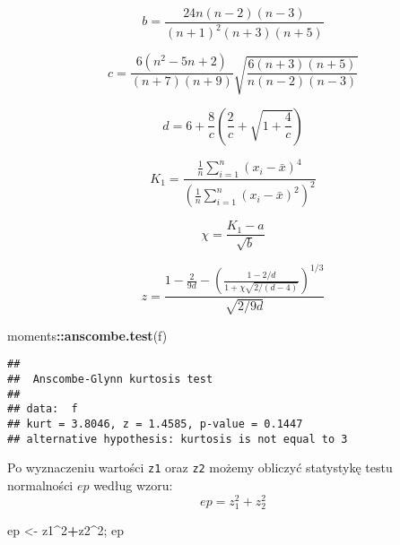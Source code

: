 \documentclass[polish,]{book}
\newenvironment{Shaded}{\begin{snugshade}}{\end{snugshade}}
\newcommand{\DecValTok}[1]{\textcolor[rgb]{0.00,0.00,0.81}{#1}}
\newcommand{\KeywordTok}[1]{\textcolor[rgb]{0.13,0.29,0.53}{\textbf{#1}}}
\newcommand{\NormalTok}[1]{#1}
\newcommand{\OperatorTok}[1]{\textcolor[rgb]{0.81,0.36,0.00}{\textbf{#1}}}
\newcommand{\StringTok}[1]{\textcolor[rgb]{0.31,0.60,0.02}{#1}}
\begin{document}
\begin{equation}
b=\frac{24n(n-2)(n-3)}{(n+1)^2(n+3)(n+5)}
\label{eq:wz1117}
\end{equation}

\begin{equation}
c=\frac{6(n^2-5n+2)}{(n+7)(n+9)}\sqrt{\frac{6(n+3)(n+5)}{n(n-2)(n-3)}}
\label{eq:wz1118}
\end{equation}

\begin{equation}
d=6+\frac{8}{c}\left(\frac{2}{c}+\sqrt{1+\frac{4}{c}}\right)
\label{eq:wz1119}
\end{equation}

\begin{equation}
K_1=\frac{\frac{1}{n}\sum_{i=1}^{n}(x_i-\bar{x})^4}{\left(\frac{1}{n}\sum_{i=1}^{n}(x_i-\bar{x})^2\right)^2}
\label{eq:wz1120}
\end{equation}

\begin{equation}
\chi=\frac{K_1-a}{\sqrt{b}}
\label{eq:wz1121}
\end{equation}

\begin{equation}
z=\frac{1-\frac{2}{9d}-\left(\frac{1-2/d}{1+\chi\sqrt{2/(d-4)}}\right)^{1/3}}{\sqrt{2/9d}}
\label{eq:wz1122}
\end{equation}

\begin{Shaded}
\begin{Highlighting}[]
\NormalTok{moments}\OperatorTok{::}\KeywordTok{anscombe.test}\NormalTok{(f)}
\end{Highlighting}
\end{Shaded}

\begin{verbatim}
## 
##  Anscombe-Glynn kurtosis test
## 
## data:  f
## kurt = 3.8046, z = 1.4585, p-value = 0.1447
## alternative hypothesis: kurtosis is not equal to 3
\end{verbatim}

Po wyznaczeniu wartości \texttt{z1} oraz \texttt{z2} możemy obliczyć statystykę testu normalności \(ep\) według wzoru:
\begin{equation}
ep=z_1^2+z_2^2
\label{eq:wz1123}
\end{equation}

\begin{Shaded}
\begin{Highlighting}[]
\NormalTok{ep <-}\StringTok{ }\NormalTok{z1}\OperatorTok{^}\DecValTok{2}\OperatorTok{+}\NormalTok{z2}\OperatorTok{^}\DecValTok{2}\NormalTok{; ep}
\end{Highlighting}
\end{Shaded}
\end{document}
